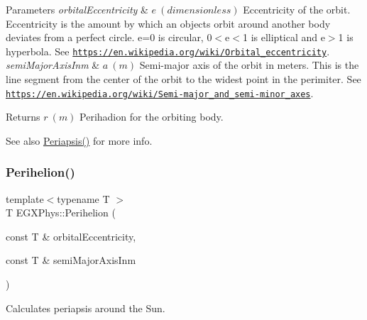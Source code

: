 \begin{DoxyParams}{Parameters}
{\em orbital\+Eccentricity} & $ e\ (dimensionless)$ Eccentricity of the orbit. Eccentricity is the amount by which an objects orbit around another body deviates from a perfect circle. e=0 is circular, 0$<$e$<$1 is elliptical and e$>$1 is hyperbola. See \href{https://en.wikipedia.org/wiki/Orbital_eccentricity}{\tt https\+://en.\+wikipedia.\+org/wiki/\+Orbital\+\_\+eccentricity}. \\
\hline
{\em semi\+Major\+Axis\+Inm} & $ a\ (m)$ Semi-\/major axis of the orbit in meters. This is the line segment from the center of the orbit to the widest point in the perimiter. See \href{https://en.wikipedia.org/wiki/Semi-major_and_semi-minor_axes}{\tt https\+://en.\+wikipedia.\+org/wiki/\+Semi-\/major\+\_\+and\+\_\+semi-\/minor\+\_\+axes}. \\
\hline
\end{DoxyParams}
\begin{DoxyReturn}{Returns}
$ r\ (m)$ Perihadion for the orbiting body. 
\end{DoxyReturn}
\begin{DoxySeeAlso}{See also}
\mbox{\hyperlink{group___e_g_x_phys-_periapsis_gad487212733711bc2ce73c8137c9309c3}{Periapsis()}} for more info. 
\end{DoxySeeAlso}
\mbox{\label{group___e_g_x_phys-_periapsis_ga10f870e17f51680c5df8731c1a7848cf}} 
\subsubsection{\texorpdfstring{Perihelion()}{Perihelion()}}
{\footnotesize\ttfamily template$<$typename T $>$ \\
T E\+G\+X\+Phys\+::\+Perihelion (\begin{DoxyParamCaption}\item[{const T \&}]{orbital\+Eccentricity,  }\item[{const T \&}]{semi\+Major\+Axis\+Inm }\end{DoxyParamCaption})}



Calculates periapsis around the Sun. 


